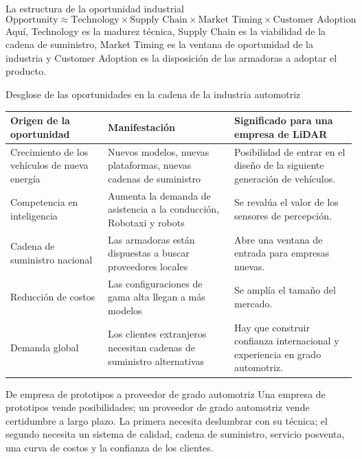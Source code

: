 \documentclass[a4paper]{article}
\begin{document}
\begin{importantbox}{La estructura de la oportunidad industrial}
\[
\text{Opportunity} \approx \text{Technology} \times \text{Supply Chain} \times \text{Market Timing} \times \text{Customer Adoption}
\]
Aquí, Technology es la madurez técnica, Supply Chain es la viabilidad de la cadena de suministro, Market Timing es la ventana de oportunidad de la industria y Customer Adoption es la disposición de las armadoras a adoptar el producto.
\end{importantbox}

\begin{knowledgebox}{Desglose de las oportunidades en la cadena de la industria automotriz}
\begin{tabularx}{\textwidth}{p{}p{}X}
\toprule
Origen de la oportunidad & Manifestación & Significado para una empresa de LiDAR \\
\midrule
Crecimiento de los vehículos de nueva energía & Nuevos modelos, nuevas plataformas, nuevas cadenas de suministro & Posibilidad de entrar en el diseño de la siguiente generación de vehículos. \\
Competencia en inteligencia & Aumenta la demanda de asistencia a la conducción, Robotaxi y robots & Se revalúa el valor de los sensores de percepción. \\
Cadena de suministro nacional & Las armadoras están dispuestas a buscar proveedores locales & Abre una ventana de entrada para empresas nuevas. \\
Reducción de costos & Las configuraciones de gama alta llegan a más modelos & Se amplía el tamaño del mercado. \\
Demanda global & Los clientes extranjeros necesitan cadenas de suministro alternativas & Hay que construir confianza internacional y experiencia en grado automotriz. \\
\bottomrule
\end{tabularx}
\end{knowledgebox}

\begin{importantbox}{De empresa de prototipos a proveedor de grado automotriz}
Una empresa de prototipos vende posibilidades; un proveedor de grado automotriz vende certidumbre a largo plazo. La primera necesita deslumbrar con su técnica; el segundo necesita un sistema de calidad, cadena de suministro, servicio posventa, una curva de costos y la confianza de los clientes.
\end{importantbox}
\end{document}
